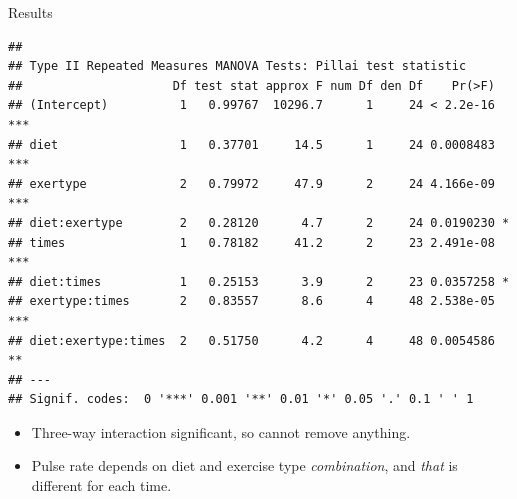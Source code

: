 \begin{frame}[fragile]{Results}
  
  
  \begin{scriptsize}
\begin{knitrout}
\color{fgcolor}\begin{kframe}
\begin{alltt}
\end{alltt}
\begin{verbatim}
## 
## Type II Repeated Measures MANOVA Tests: Pillai test statistic
##                     Df test stat approx F num Df den Df    Pr(>F)    
## (Intercept)          1   0.99767  10296.7      1     24 < 2.2e-16 ***
## diet                 1   0.37701     14.5      1     24 0.0008483 ***
## exertype             2   0.79972     47.9      2     24 4.166e-09 ***
## diet:exertype        2   0.28120      4.7      2     24 0.0190230 *  
## times                1   0.78182     41.2      2     23 2.491e-08 ***
## diet:times           1   0.25153      3.9      2     23 0.0357258 *  
## exertype:times       2   0.83557      8.6      4     48 2.538e-05 ***
## diet:exertype:times  2   0.51750      4.2      4     48 0.0054586 ** 
## ---
## Signif. codes:  0 '***' 0.001 '**' 0.01 '*' 0.05 '.' 0.1 ' ' 1
\end{verbatim}
\end{kframe}
\end{knitrout}
  \end{scriptsize}

\begin{itemize}
\item Three-way interaction significant, so cannot remove anything.
\item Pulse rate depends on diet and exercise type \emph{combination},
  and \emph{that} is different for each time.
\end{itemize}
  
\end{frame}

